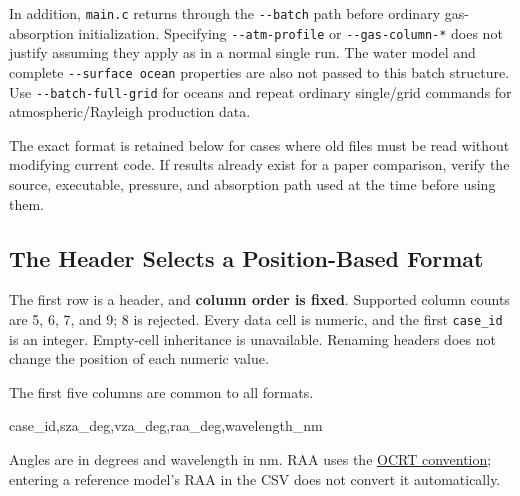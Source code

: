 In addition, \texttt{main.\allowbreak{}c} returns through the \texttt{-\allowbreak{}-\allowbreak{}batch} path before ordinary gas-absorption initialization. Specifying \texttt{-\allowbreak{}-\allowbreak{}atm-\allowbreak{}profile} or \texttt{-\allowbreak{}-\allowbreak{}gas-\allowbreak{}column-\allowbreak{}*} does not justify assuming they apply as in a normal single run. The water model and complete \texttt{-\allowbreak{}-\allowbreak{}surface ocean} properties are also not passed to this batch structure. Use \texttt{-\allowbreak{}-\allowbreak{}batch-\allowbreak{}full-\allowbreak{}grid} for oceans and repeat ordinary single/grid commands for atmospheric/Rayleigh production data.

The exact format is retained below for cases where old files must be read without modifying current code. If results already exist for a paper comparison, verify the source, executable, pressure, and absorption path used at the time before using them.

\subsection{The Header Selects a Position-Based Format}
\label{sec:auto:08_input_formats:3.2}
The first row is a header, and \textbf{column order is fixed}. Supported column counts are 5, 6, 7, and 9; 8 is rejected. Every data cell is numeric, and the first \texttt{case\_\allowbreak{}id} is an integer. Empty-cell inheritance is unavailable. Renaming headers does not change the position of each numeric value.

The first five columns are common to all formats.


\begin{ManualCode}
case_id,sza_deg,vza_deg,raa_deg,wavelength_nm
\end{ManualCode}

Angles are in degrees and wavelength in nm. RAA uses the \hyperref[chap:01_concepts_geometry]{OCRT convention}; entering a reference model's RAA in the CSV does not convert it automatically.


